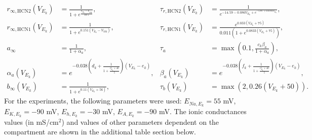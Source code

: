 \begin{align*}
    r_{\infty,\text{HCN2}}(V_{E_k}) & = \frac{1}{1 + e^{\frac{V_{E_k} - V_{50k}}{10.5}}},                                         & \tau_{r,\text{HCN2}}(V_{E_k}) & = \frac{1}{e^{-14.59 - 0.086V_{E_k} + e^{-1.87 + 0.0701V_{E_k}}}},                          \\
    r_{\infty,\text{HCN1}}(V_{E_k}) & = \frac{1}{1 + e^{0.151(V_{E_k}-V_{50k})}},                                                 & \tau_{r,\text{HCN1}}(V_{E_k}) & = \frac{e^{0.033(V_{E_k} + 75)}}{0.011 \left( 1 + e^{0.0833(V_{E_k}+75)} \right)},          \\
    a_{\infty}                      & = \frac{1}{1 + \alpha_a},                                                                   & \tau_a                        & = \max \left( 0.1, \frac{c_k \beta_a}{1 + \alpha_a} \right),                                \\
    \alpha_a(V_{E_k})               & = e^{-0.038 \left( d_k + \frac{1}{1 + {\frac{e^V_{E_k} + 40}{5}}} \right) (V_{E_k} - e_k)}, & \beta_a(V_{E_k})              & = e^{-0.038 \left( f_k + \frac{1}{1 + {\frac{e^V_{E_k} + 40}{5}}} \right) (V_{E_k} - e_k)}, \\
    b_{\infty}(V_{E_k})             & = \frac{1}{1 + e^{0.11(V_{E_k} + 56)}},                                                     & \tau_b(V_{E_k})               & = \max \left( 2, 0.26(V_{E_k} + 50) \right).
\end{align*}
For the experiments, the following parameters were used:
\(E_{Na,E_k} = 55\) mV, \(E_{K,E_k} = -90\) mV, \(E_{h,E_k} = -30\) mV, \(E_{A,E_k} = -90\) mV.
The ionic conductances values (in mS/cm\(^2\)) and values of other parameters dependent on the compartment are shown in the additional table section below.\pagebreak
